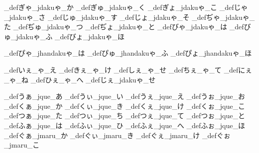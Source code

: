 \brl@char_def{ぎゃ}{\brl@char@alias_jdakuゃ\brl@char@alias_か}
\brl@char_def{ぎゅ}{\brl@char@alias_jdakuゃ\brl@char@alias_く}
\brl@char_def{ぎょ}{\brl@char@alias_jdakuゃ\brl@char@alias_こ}
\brl@char_def{じゃ}{\brl@char@alias_jdakuゃ\brl@char@alias_さ}
\brl@char_def{じゅ}{\brl@char@alias_jdakuゃ\brl@char@alias_す}
\brl@char_def{じょ}{\brl@char@alias_jdakuゃ\brl@char@alias_そ}
\brl@char_def{ぢゃ}{\brl@char@alias_jdakuゃ\brl@char@alias_た}
\brl@char_def{ぢゅ}{\brl@char@alias_jdakuゃ\brl@char@alias_つ}
\brl@char_def{ぢょ}{\brl@char@alias_jdakuゃ\brl@char@alias_と}
\brl@char_def{びゃ}{\brl@char@alias_jdakuゃ\brl@char@alias_は}
\brl@char_def{びゅ}{\brl@char@alias_jdakuゃ\brl@char@alias_ふ}
\brl@char_def{びょ}{\brl@char@alias_jdakuゃ\brl@char@alias_ほ}

\brl@char_def{ぴゃ}{\brl@char@alias_jhandakuゃ\brl@char@alias_は}
\brl@char_def{ぴゅ}{\brl@char@alias_jhandakuゃ\brl@char@alias_ふ}
\brl@char_def{ぴょ}{\brl@char@alias_jhandakuゃ\brl@char@alias_ほ}

\brl@char_def{いぇ}{\brl@char@alias_ゃ\brl@char@alias_え}
\brl@char_def{きぇ}{\brl@char@alias_ゃ\brl@char@alias_け}
\brl@char_def{しぇ}{\brl@char@alias_ゃ\brl@char@alias_せ}
\brl@char_def{ちぇ}{\brl@char@alias_ゃ\brl@char@alias_て}
\brl@char_def{にぇ}{\brl@char@alias_ゃ\brl@char@alias_ね}
\brl@char_def{ひぇ}{\brl@char@alias_ゃ\brl@char@alias_へ}
\brl@char_def{じぇ}{\brl@char@alias_jdakuゃ\brl@char@alias_せ}

\brl@char_def{うぁ}{\brl@char@alias_jque\brl@char@alias_あ}
\brl@char_def{うぃ}{\brl@char@alias_jque\brl@char@alias_い}
\brl@char_def{うぇ}{\brl@char@alias_jque\brl@char@alias_え}
\brl@char_def{うぉ}{\brl@char@alias_jque\brl@char@alias_お}
\brl@char_def{くぁ}{\brl@char@alias_jque\brl@char@alias_か}
\brl@char_def{くぃ}{\brl@char@alias_jque\brl@char@alias_き}
\brl@char_def{くぇ}{\brl@char@alias_jque\brl@char@alias_け}
\brl@char_def{くぉ}{\brl@char@alias_jque\brl@char@alias_こ}
\brl@char_def{つぁ}{\brl@char@alias_jque\brl@char@alias_た}
\brl@char_def{つぃ}{\brl@char@alias_jque\brl@char@alias_ち}
\brl@char_def{つぇ}{\brl@char@alias_jque\brl@char@alias_て}
\brl@char_def{つぉ}{\brl@char@alias_jque\brl@char@alias_と}
\brl@char_def{ふぁ}{\brl@char@alias_jque\brl@char@alias_は}
\brl@char_def{ふぃ}{\brl@char@alias_jque\brl@char@alias_ひ}
\brl@char_def{ふぇ}{\brl@char@alias_jque\brl@char@alias_へ}
\brl@char_def{ふぉ}{\brl@char@alias_jque\brl@char@alias_ほ}
\brl@char_def{ぐぁ}{\brl@char@alias_jmaru\brl@char@alias_か}
\brl@char_def{ぐぃ}{\brl@char@alias_jmaru\brl@char@alias_き}
\brl@char_def{ぐぇ}{\brl@char@alias_jmaru\brl@char@alias_け}
\brl@char_def{ぐぉ}{\brl@char@alias_jmaru\brl@char@alias_こ}

